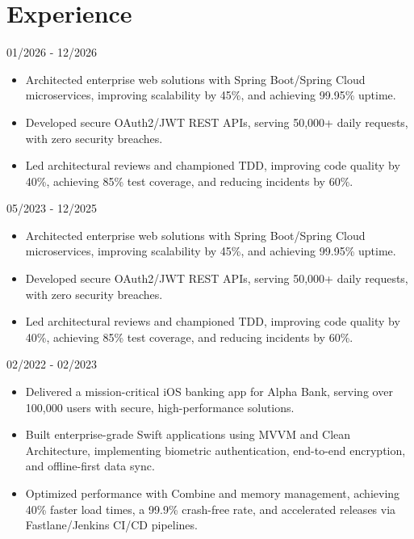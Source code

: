 \documentclass{mycv}
\begin{document}
\section*{Experience}

{01/2026 - 12/2026}

\begin{itemize}
    \item Architected enterprise web solutions with Spring Boot/Spring Cloud microservices, improving scalability by 45\%, and
achieving 99.95\% uptime.
    \item Developed secure OAuth2/JWT REST APIs, serving 50,000+ daily requests, with zero security breaches.
    \item Led architectural reviews and championed TDD, improving code quality by 40\%, achieving 85\% test coverage, and
reducing incidents by 60\%.
\end{itemize}

{05/2023 - 12/2025}

\begin{itemize}
    \item Architected enterprise web solutions with Spring Boot/Spring Cloud microservices, improving scalability by 45\%, and
achieving 99.95\% uptime.
    \item Developed secure OAuth2/JWT REST APIs, serving 50,000+ daily requests, with zero security breaches.
    \item Led architectural reviews and championed TDD, improving code quality by 40\%, achieving 85\% test coverage, and
reducing incidents by 60\%.
\end{itemize}

{02/2022 - 02/2023}

\begin{itemize}
    \item Delivered a mission-critical iOS banking app for Alpha Bank, serving over 100,000 users with secure, high-performance
solutions.
    \item Built enterprise-grade Swift applications using MVVM and Clean Architecture, implementing biometric authentication,
end-to-end encryption, and offline-first data sync.
    \item Optimized performance with Combine and memory management, achieving 40\% faster load times, a 99.9\% crash-free
rate, and accelerated releases via Fastlane/Jenkins CI/CD pipelines.
\end{itemize}
\end{document}
